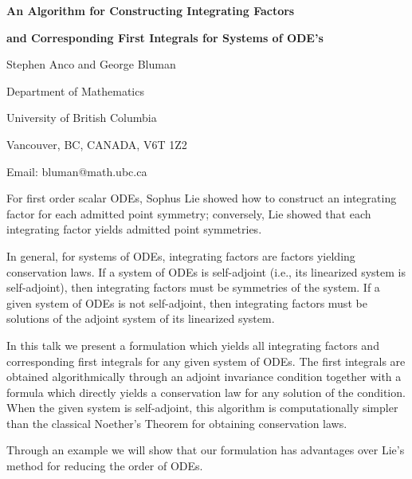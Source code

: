 

\centerline{\bf An Algorithm for Constructing Integrating Factors}
\centerline{\bf and Corresponding First Integrals for Systems of ODE's}

\vskip 0.3cm

\centerline{Stephen Anco and George Bluman}

\centerline{Department of Mathematics}
\centerline{University of British Columbia}
\centerline{Vancouver, BC, CANADA, V6T 1Z2}
\centerline{Email: bluman@math.ubc.ca}

\vskip 0.3cm

For first order scalar ODEs, Sophus Lie showed how to construct an
integrating factor for each admitted point symmetry; conversely, Lie
showed that each integrating factor yields admitted point symmetries.

In general, for systems of ODEs, integrating factors are factors
yielding conservation laws. If a system of ODEs is self-adjoint (i.e.,
its linearized system is self-adjoint), then  integrating factors must
be symmetries of the system.  If a given system of ODEs is not
self-adjoint, then integrating factors must be solutions of the adjoint
system of its linearized system.

In this talk we present a formulation which yields all integrating
factors and corresponding first integrals for any given system of ODEs.
The first integrals are obtained algorithmically through an adjoint
invariance condition together with a formula which directly yields a
conservation law for any solution of the condition.  When the given
system is self-adjoint, this algorithm is computationally simpler than
the classical Noether's Theorem for obtaining conservation laws.

Through an example we will show that our formulation has advantages over
Lie's method for reducing the order of ODEs.


